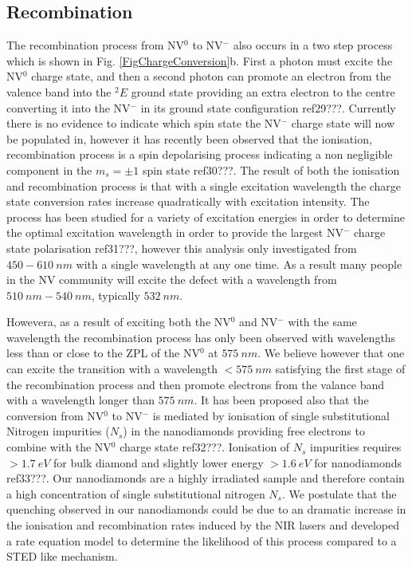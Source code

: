 \documentclass[preprint,prl]{revtex4}
\begin{document}
\subsection{Recombination}
The recombination process from NV$^0$ to NV$^-$ also occurs in a two step process which is shown in Fig. \ref{FigChargeConversion}b. First a photon must excite the NV$^0$ charge state, and then a second photon can promote an electron from the valence band into the $^2E$ ground state providing an extra electron to the centre converting it into the NV$^-$ in its ground state configuration ref29???. Currently there is no evidence to indicate which spin state the NV$^-$ charge state will now be populated in, however it has recently been observed that the ionisation, recombination process is a spin depolarising process indicating a non negligible component in the $m_s=\pm1$ spin state ref30???. The result of both the ionisation and recombination process is that with a single excitation wavelength the charge state conversion rates increase quadratically with excitation intensity. The process has been studied for a variety of excitation energies in order to determine the optimal excitation wavelength in order to provide the largest NV$^-$ charge state polarisation ref31???, however this analysis only investigated from $\SI{450}-\SI{610}{nm}$ with a single wavelength at any one time. As a result many people in the NV community will excite the defect with a wavelength from $\SI{510}{nm}-\SI{540}{nm}$, typically $\SI{532}{nm}$.

Howevera, as a result of exciting both the NV$^0$ and NV$^-$ with the same wavelength the recombination process has only been observed with wavelengths less than or close to the ZPL of the NV$^0$ at $\SI{575}{nm}$. We believe however that one can excite the transition with a wavelength $<\SI{575}{nm}$ satisfying the first stage of the recombination process and then promote electrons from the valance band with a wavelength longer than $\SI{575}{nm}$. It has been proposed also that the conversion from NV$^0$ to NV$^-$ is mediated by ionisation of single substitutional Nitrogen impurities ($N_s$) in the nanodiamonds providing free electrons to combine with the NV$^0$ charge state ref32???. Ionisation of $N_s$ impurities requires $>\SI{1.7}{eV}$ for bulk diamond and slightly lower energy $>\SI{1.6}{eV}$ for nanodiamonds ref33???. Our nanodiamonds are a highly irradiated sample and therefore contain a high concentration of single substitutional nitrogen $N_s$. We postulate that the quenching observed in our nanodiamonds could be due to an dramatic increase in the ionisation and recombination rates induced by the NIR lasers and developed a rate equation model to determine the likelihood of this process compared to a STED like mechanism.
\end{document}
